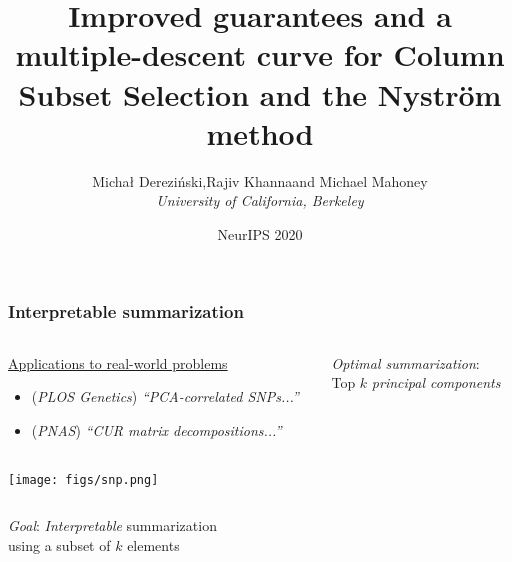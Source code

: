 \message{ !name(nystrom-press.tex)}\documentclass[10pt,handout]{beamer}
\title[]{\large\textrm{Improved guarantees and a multiple-descent curve
for Column Subset Selection and the Nystr\"om method}}
\author[]{Micha{\l} Derezi\'{n}ski,\quad Rajiv Khanna\quad and\quad
  Michael Mahoney\\[2mm]
\small\textit{University of California, Berkeley}}
\date{NeurIPS 2020}
\begin{document}


\linespread{1.3}

\begin{frame}
  \frametitle{Interpretable summarization}
  \begin{columns}
\begin{column}{.65\textwidth}
  \hspace{3mm}\underline{Applications to real-world problems}
  \begin{itemize}
  \item   \onslide<+->
    {\scriptsize\cite{paschou2007pca} (\textit{PLOS Genetics})
      \textit{``PCA-correlated SNPs...''}} %
\item   \onslide<+-> \cite{mahoney2009cur} (\textit{PNAS})
  {\scriptsize\textit{``CUR matrix decompositions...''}}
  \end{itemize}
\end{column}
\begin{column}{.4\textwidth}
  \vspace{-2mm}
  
  \emph{Optimal summarization}:\\[1mm]
  Top $k$ \textit{principal components}\\
  \\[5mm]
  \onslide<+->
\end{column}
\end{columns}
  \begin{center}
    \texttt{[image: figs/snp.png]}
  \end{center}
  \vspace{3mm}
  
  \begin{columns}
    \begin{column}{0.71\textwidth}
      \onslide<+->
      \emph{Goal}: \textit{Interpretable} summarization\\
      using a subset of $k$ elements
\vspace{3mm}


\end{column}
\end{columns}
\end{frame}
\end{document}
